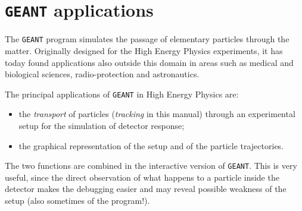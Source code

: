        
       
\section{{\tt GEANT} applications}
 
The {\tt GEANT} program simulates the passage of elementary particles through
the matter. Originally designed for the High Energy Physics experiments,
it has today found applications also outside this domain in areas such as
medical and biological sciences, radio-protection and astronautics.

The principal applications of {\tt GEANT} in High Energy Physics are:
\begin{itemize}
\item the {\it transport} 
of particles ({\it tracking} in this manual)
through an experimental setup for the simulation
of detector response;
\item
the graphical representation of the setup and of the particle trajectories.
\end{itemize}

The two functions are combined in the interactive version of {\tt GEANT}.
This is very useful,
since the direct
observation of what happens to a particle inside the detector
makes the debugging easier and may reveal possible weakness of the
setup (also sometimes of the program!).

